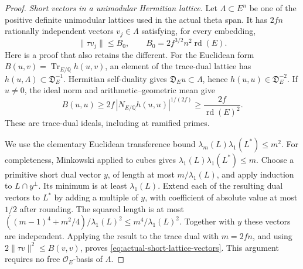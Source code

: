 \begin{proof}
\emph{Short vectors in a unimodular Hermitian lattice.}
Let $\Lambda\subset E^n$ be one of the positive definite unimodular
lattices used in the actual theta span.  It has $2fn$ rationally
independent vectors $v_j\in\Lambda$ satisfying, for every embedding,
\begin{equation}\label{eq:actual-short-lattice-vectors}
             \|\tau v_j\|\le B_0,
             \qquad B_0=2f^{3/2}n^2\operatorname{rd}(E).
\end{equation}
Here is a proof that also retains the different.  For the Euclidean
form $B(u,v)=\operatorname{Tr}_{E/\mathbb Q}h(u,v)$, an element of
the trace-dual lattice has $h(u,\Lambda)\subset\mathfrak D_E^{-1}$.
Hermitian self-duality gives $\mathfrak D_Eu\subset\Lambda$, hence
$h(u,u)\in\mathfrak D_E^{-2}$.  If $u\ne0$, the ideal norm and
arithmetic--geometric mean give
\[
 B(u,u)\ge 2f\,|N_{E/\mathbb Q}h(u,u)|^{1/(2f)}
              \ge\frac{2f}{\operatorname{rd}(E)^2}.
\]
These are trace-dual ideals, including at ramified primes.

We use the elementary Euclidean transference bound
$\lambda_m(L)\lambda_1(L^*)\le m^2$.  For completeness,
Minkowski applied to cubes gives
$\lambda_1(L)\lambda_1(L^*)\le m$.  Choose a primitive short
dual vector $y$, of length at most $m/\lambda_1(L)$, and apply
induction to $L\cap y^\perp$.  Its minimum is at least
$\lambda_1(L)$.  Extend each of the resulting dual vectors to
$L^*$ by adding a multiple of $y$, with coefficient of absolute
value at most $1/2$ after rounding.  The squared length is at most
$((m-1)^4+m^2/4)/\lambda_1(L)^2\le m^4/\lambda_1(L)^2$.
Together with $y$ these vectors are independent.  Applying the result
to the trace dual with $m=2fn$, and using
$2\|\tau v\|^2\le B(v,v)$, proves
\eqref{eq:actual-short-lattice-vectors}.  This argument requires no
free $\mathcal O_E$-basis of $\Lambda$.


\end{proof}
